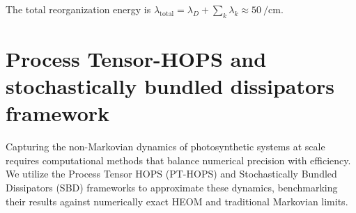 \documentclass[11pt,a4paper]{article}
\begin{document}
The total reorganization energy is $\lambda_{\mathrm{total}} = \lambda_D + \sum_k \lambda_k \approx \SI{50}{\per\cm}$.

\section{Process Tensor-HOPS and stochastically bundled dissipators framework}\label{si:pthops}

Capturing the non-Markovian dynamics of photosynthetic systems at scale requires computational methods that balance numerical precision with efficiency. We utilize the Process Tensor HOPS (PT-HOPS) and Stochastically Bundled Dissipators (SBD) frameworks to approximate these dynamics, benchmarking their results against numerically exact HEOM and traditional Markovian limits.
\end{document}
